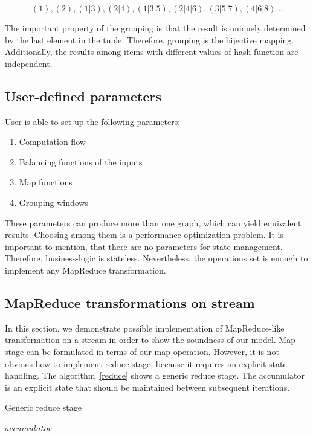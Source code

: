 \[(1), (2), (1|3), (2|4), (1|3|5), (2|4|6), (3|5|7), (4|6|8)...\]

The important property of the grouping is that the result is uniquely determined by the last element in the tuple. Therefore, grouping is the bijective mapping. Additionally, the results among items with different values of hash function are independent.

\subsection{User-defined parameters}

User is able to set up the following parameters:

\begin{enumerate}
  \item{Computation flow}
  \item{Balancing functions of the inputs}
  \item{Map functions}
  \item{Grouping windows}
\end{enumerate}

These parameters can produce more than one graph, which can yield equivalent results. Choosing among them is a performance optimization problem.    
It is important to mention, that there are no parameters for state-management. Therefore, business-logic is stateless. Nevertheless, the operations set is enough to implement any MapReduce transformation.

\subsection{MapReduce transformations on stream}

In this section, we demonstrate possible implementation of MapReduce-like transformation on a stream in order to show the soundness of our model. Map stage can be formulated in terms of our map operation. However, it is not obvious how to implement reduce stage, because it requires an explicit state handling. The algorithm~\ref{reduce} shows a generic reduce stage. The accumulator is an explicit state that should be maintained between subsequent iterations.

\begin{algorithm}
\caption{Generic reduce stage}
\label{reduce}
\begin{algorithmic}
    \State $accumulator$ 
      \State {}
    \EndFor
    \State {}
  \EndFunction
\end{algorithmic}
\end{algorithm}

